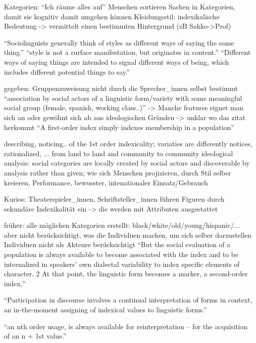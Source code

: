 %
%

Kategorien: ``Ich räume alles auf''
Menschen sortieren Sachen in Kategorien, damit sie kognitiv damit umgehen können
Kleidungsstil: indexikalische Bedeutung -> vermittelt einen bestimmten Hintergrund (zB Sakko->Prof)

``Sociolinguists generally think of styles as different ways of saying the same thing.''
``style is not a surface manifestation, but originates in content.''
``Different ways of saying things are intended to signal different ways of being,
which includes different potential things to say.''

gegeben: Gruppenzuweisung
nicht durch die Sprecher\_innen selbst bestimmt
``association by social actors of a linguistic form/variety with some meaningful social group (female, spanish, working class..)'' %
-> Manche features eignet man sich an oder gewöhnt sich ab aus ideologischen Gründen
-> unklar wo das zitat herkommt
``A first-order index simply indexes membership in a population''


describing, noticing.. of the 1st order indexicality;
variaties are differently notices, rationalized, ... from land to land and community to community
ideological analysis: social categories are locally created by social actors and discoverable by analysis rather than given; %
wie sich Menschen projizieren, durch Stil selber kreieren, Performance, bewusster, intenationaler Einsatz/Gebrauch

Kurios: Theaterspieler\_innen, Schriftsteller\_innen führen Figuren durch sekundäre Indexikalität ein -> die werden mit Attributen ausgestattet

früher: alle möglichen Kategorien erstellt: black/white/old/young/hispanic/...
aber nicht berücksichtigt, was die Individuen machen, um sich selber darzustellen
Individuen nicht als Akteure berücksichtigt
``But the social evaluation of a population
is always available to become associated with the index and to be internalized
in speakers’ own dialectal variability to index specific elements of character. 2 At
that point, the linguistic form becomes a marker, a second-order index,''

``Participation in discourse involves a continual
interpretation of forms in context, an in-the-moment assigning of indexical
values to linguistic forms.''

``an nth order usage, is always available for reinterpretation – for the
acquisition of an n + 1st value.''


